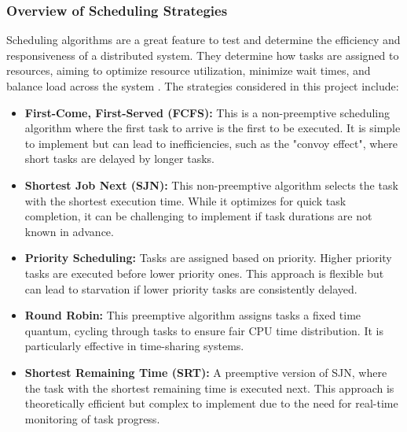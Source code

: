 \documentclass{article}
\begin{document}
\subsubsection{Overview of Scheduling Strategies}
Scheduling algorithms are a great feature to test and determine the efficiency and responsiveness of a distributed system. They determine how tasks are assigned to resources, aiming to optimize resource utilization, minimize wait times, and balance load across the system \cite{Jalali et. al., 2024}. The strategies considered in this project include:
\begin{itemize}
    \item \textbf{First-Come, First-Served (FCFS):} This is a non-preemptive scheduling algorithm where the first task to arrive is the first to be executed. It is simple to implement but can lead to inefficiencies, such as the "convoy effect", where short tasks are delayed by longer tasks.
    
    \item \textbf{Shortest Job Next (SJN):} This non-preemptive algorithm selects the task with the shortest execution time. While it optimizes for quick task completion, it can be challenging to implement if task durations are not known in advance.
    
    \item \textbf{Priority Scheduling:} Tasks are assigned based on priority. Higher priority tasks are executed before lower priority ones. This approach is flexible but can lead to starvation if lower priority tasks are consistently delayed.
    
    \item \textbf{Round Robin:} This preemptive algorithm assigns tasks a fixed time quantum, cycling through tasks to ensure fair CPU time distribution. It is particularly effective in time-sharing systems.
    
    \item \textbf{Shortest Remaining Time (SRT):} A preemptive version of SJN, where the task with the shortest remaining time is executed next. This approach is theoretically efficient but complex to implement due to the need for real-time monitoring of task progress.
\end{itemize}
\end{document}
